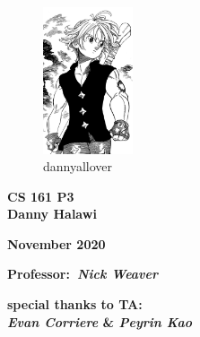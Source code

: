 \documentclass[11pt]{article}
\begin{document}
\pagestyle{fancy}
   \lhead{}\rhead{}
   \lfoot{\textcolor{light-gray}{\small dannyallover}}
        \cfoot{{\thepage}}
        \rfoot{}
  \renewcommand{\headrulewidth}{0pt}


\newpage
\phantom{22}
\vspace{-3cm}

\begin{center}

\begin{figure}[hbt!]
    \centering
    \includegraphics[width=100px]{meliodas.png}
    \caption*{dannyallover}
\end{figure}


\bigskip
{\fontsize{30}{10}\selectfont 
\bigskip


\bigskip
\medskip
{ \textbf{CS 161 P3 \\}}
{ \textbf{\huge Danny Halawi \\}}}

\medskip
{ \textbf{\Large November 2020}}
\bigskip

\end{center}


\bigskip

\bigskip


\thispagestyle{empty}


\begin{center}
\medskip
{\LARGE \textbf{Professor:\ \textit{Nick Weaver}}}

\bigskip

\begin{center}
{\LARGE \textbf{special thanks to TA:\ \\ \medskip \textit{Evan Corriere} \& \textit{Peyrin Kao}}}
\end{center}

\bigskip

\end{center}

\linespread{1.5}

\newpage\setlength{\parskip}{1mm}
\onehalfspacing
\bigskip
\setcounter{page}{1}
\end{document}
